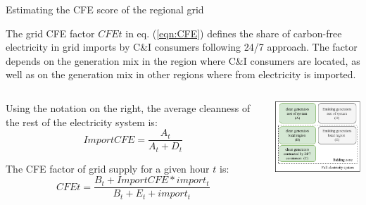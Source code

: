 \begin{frame}{Estimating the CFE score of the regional grid}

  {\small

  The \alert{grid CFE factor} $CFEt$ in eq. (\ref{eqn:CFE}) defines the share of 
  carbon-free electricity  in grid imports by C\&I consumers following 24/7 approach. 
  The factor depends on the generation mix in the region where C\&I consumers are located, 
  as well as on the generation mix in other regions where from electricity is imported. 

  \begin{columns}
    \begin{column}{8cm}

  Using the notation on the right, the average cleanness 
  of the rest of the electricity system is:
  \begin{equation*}
  ImportCFE = \frac{A_t}{A_t + D_t}
  \end{equation*}

  The CFE factor of grid supply for a given hour $t$ is:
  \begin{equation*}
  CFEt = \frac{B_t + ImportCFE * import_t}{B_t + E_t + import_t}
  \end{equation*}    

  \end{column}

  \begin{column}{5cm}
  \centering
  \includegraphics[width=5cm]{images/cfe.png}
  \end{column}
    
  \end{columns}

  \noindent{}
  }
\end{frame}

